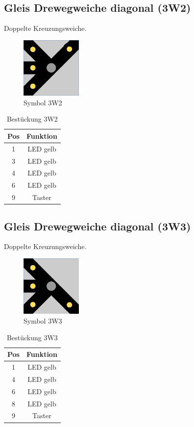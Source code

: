\documentclass[10pt,a4paper]{article}
\begin{document}
\subsection{Gleis Drewegweiche diagonal (3W2)}
Doppelte Kreuzungsweiche.
\begin{figure}[hbtp]
\centering
\includegraphics[width=3cm]{../folien/3w2.png}
\caption{Symbol 3W2}
\end{figure}
\begin{table}[h!]
\centering
\begin{tabular}{c|c}
\textbf{Pos} & \textbf{Funktion} \\ \hline
1 & LED gelb \\
3 & LED gelb \\
4 & LED gelb \\
6 & LED gelb \\
9 & Taster
\end{tabular}
\caption{Bestückung 3W2}
\end{table}


\subsection{Gleis Drewegweiche diagonal (3W3)}
Doppelte Kreuzungsweiche.
\begin{figure}[hbtp]
\centering
\includegraphics[width=3cm]{../folien/3w3.png}
\caption{Symbol 3W3}
\end{figure}
\begin{table}[h!]
\centering
\begin{tabular}{c|c}
\textbf{Pos} & \textbf{Funktion} \\ \hline
1 & LED gelb \\
4 & LED gelb \\
6 & LED gelb \\
8 & LED gelb \\
9 & Taster
\end{tabular}
\caption{Bestückung 3W3}
\end{table}
\end{document}
